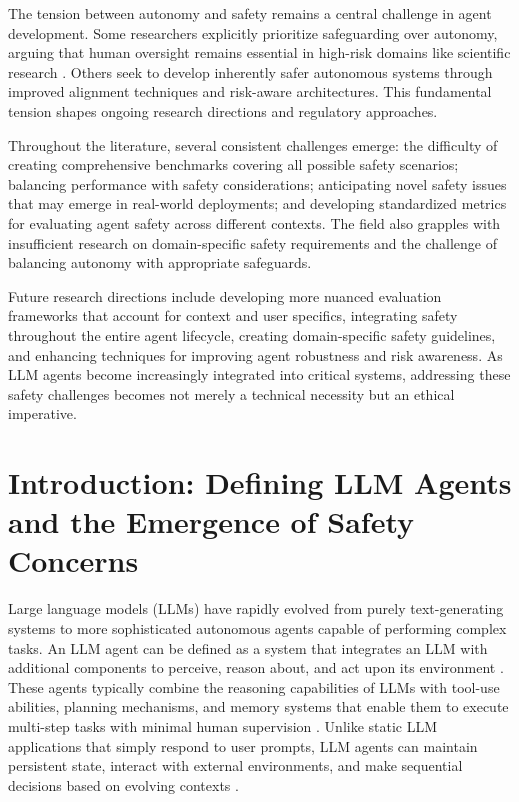 \documentclass[conference]{IEEEtran}
\begin{document}
The tension between autonomy and safety remains a central challenge in agent development. Some researchers explicitly prioritize safeguarding over autonomy, arguing that human oversight remains essential in high-risk domains like scientific research \cite{2402.04247}. Others seek to develop inherently safer autonomous systems through improved alignment techniques and risk-aware architectures. This fundamental tension shapes ongoing research directions and regulatory approaches.

Throughout the literature, several consistent challenges emerge: the difficulty of creating comprehensive benchmarks covering all possible safety scenarios; balancing performance with safety considerations; anticipating novel safety issues that may emerge in real-world deployments; and developing standardized metrics for evaluating agent safety across different contexts. The field also grapples with insufficient research on domain-specific safety requirements and the challenge of balancing autonomy with appropriate safeguards.

Future research directions include developing more nuanced evaluation frameworks that account for context and user specifics, integrating safety throughout the entire agent lifecycle, creating domain-specific safety guidelines, and enhancing techniques for improving agent robustness and risk awareness. As LLM agents become increasingly integrated into critical systems, addressing these safety challenges becomes not merely a technical necessity but an ethical imperative.



\section{Introduction: Defining LLM Agents and the Emergence of Safety Concerns}

Large language models (LLMs) have rapidly evolved from purely text-generating systems to more sophisticated autonomous agents capable of performing complex tasks. An LLM agent can be defined as a system that integrates an LLM with additional components to perceive, reason about, and act upon its environment \cite{2411.09523}. These agents typically combine the reasoning capabilities of LLMs with tool-use abilities, planning mechanisms, and memory systems that enable them to execute multi-step tasks with minimal human supervision \cite{2412.14470}. Unlike static LLM applications that simply respond to user prompts, LLM agents can maintain persistent state, interact with external environments, and make sequential decisions based on evolving contexts \cite{2412.17686}.
\end{document}
